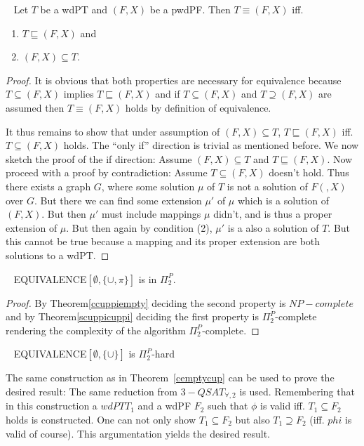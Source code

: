 \begin{theorem}~\cite{pichler2014containment}
Let $T$ be a wdPT and $(F,X)$ be a pwdPF.
Then $T \equiv (F,X)$ iff.
\begin{enumerate}
\item $T \sqsubseteq (F,X)$ and
\item $(F,X) \subseteq T$.
\end{enumerate}
\end{theorem}
\begin{proof}
It is obvious that both properties are necessary for equivalence because 
$T \subseteq (F,X)$ implies $T \sqsubseteq (F,X)$ and if  $T \subseteq (F,X)$
and
$T \supseteq (F,X)$ are assumed then $T \equiv (F,X)$ holds by definition of equivalence.

It thus remains to show that  under assumption of 
$(F,X) \subseteq T$, $T \sqsubseteq (F,X)$ iff. $T \subseteq (F,X)$  holds. 
The ``only if'' direction is trivial as mentioned before.
We now sketch the proof of the if direction:
Assume  $(F,X) \subseteq T$ and $T \sqsubseteq (F,X)$.
Now proceed with a proof by contradiction: Assume $T \subseteq (F,X)$ doesn't
hold. Thus there exists a graph $G$, where some solution $\mu$ of $T$ is not a
solution of $F(,X)$ over $G$. But there we can find some extension $\mu'$ of
$\mu$ which is a solution of $(F,X)$. But then $\mu'$ must include mappings
$\mu$ didn't, and is thus a proper extension of $\mu$. But then again by
condition (2), $\mu'$ is a also a solution of $T$. But this cannot be true
because a mapping and its proper extension are both solutions to a wdPT. 
\end{proof}

\begin{theorem}~\cite{pichler2014containment}
EQUIVALENCE$[\emptyset,\{\cup,\pi\}]$ is in $\Pi_2^P$.
\end{theorem}
\begin{proof}
By Theorem\ref{ccuppiempty} deciding the second property is $NP-complete$ and
by Theorem\ref{scuppicuppi} deciding the first property is $\Pi_2^P$-complete
rendering the complexity of the algorithm $\Pi_2^P$-complete.
\end{proof}

\begin{theorem}~\cite{pichler2014containment}
EQUIVALENCE$[\emptyset,\{\cup\}]$ is $\Pi_2^P$-hard
\end{theorem}
\begin{proofidea}
The same construction as in Theorem~\ref{cemptycup} can be used to prove the
desired result: The same reduction from $3-QSAT_{\forall,2}$ is used.
Remembering that in this construction a $wdPT T_1$ and a wdPF $F_2$ such that
$\phi$ is valid iff.  $T_1 \subseteq F_2$ holds is constructed.
One can
not only show $T_1 \subseteq F_2$ but also $T_1 \supseteq F_2$ (iff. $phi$ is
valid of course). This
argumentation yields the desired result.
\end{proofidea}


